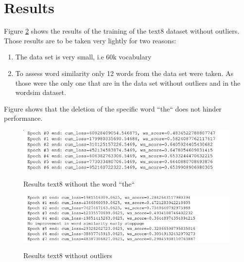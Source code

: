 \documentclass{scrartcl}
\begin{document}
\section{Results}
Figure \ref{fig:results_w/o_outliers} shows the results of the training of the text8 dataset without outliers. Those results are to be taken very lightly for two reasons: 
\begin{enumerate}
\item The data set is very small, i.e 60k vocabulary
\item To assess word similarity only 12 words from the data set were taken. As those were the only one that are in the data set without outliers and in the wordsim dataset. 
\end{enumerate}

Figure shows that the deletion of the specific word ``the`` does not hinder performance. 

\begin{figure}[h!]
\caption{Results text8 without the word ``the``}
\includegraphics[scale=0.65]{results_without_the}
   \label{fig:results_w/o_outliers}%

\centering
\end{figure}

\begin{figure}[h!]
\caption{Results text8 without outliers}
\includegraphics[scale=0.65]{text8_without_outliers}
   \label{fig:results_w/o_outliers}%

\centering
\end{figure}
\end{document}
